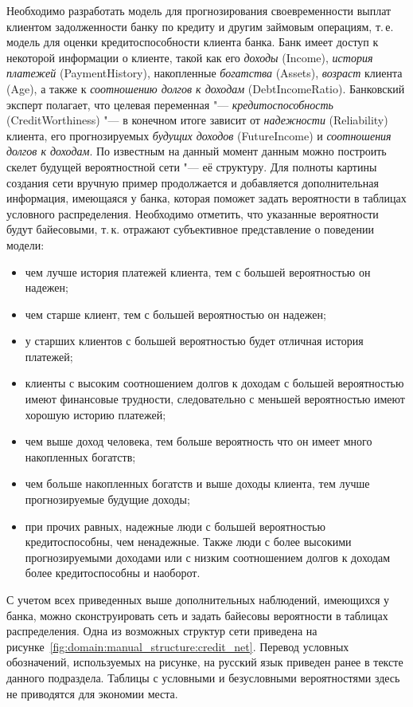 Необходимо разработать модель для  прогнозирования своевременности выплат клиентом задолженности банку по кредиту и другим займовым операциям, т.\,е. модель для оценки кредитоспособности клиента банка.
Банк имеет доступ к некоторой информации о клиенте, такой как его \emph{доходы} (Income), \emph{история платежей} (PaymentHistory), накопленные \emph{богатства} (Assets), \emph{возраст} клиента (Age), а также к \emph{соотношению долгов к доходам} (DebtIncomeRatio).
Банковский эксперт полагает, что целевая переменная "--- \emph{кредитоспособность} (CreditWorthiness) "--- в конечном итоге зависит от \emph{надежности} (Reliability) клиента, его прогнозируемых \emph{будущих доходов} (FutureIncome) и \emph{соотношения долгов к доходам}.
По известным на данный момент данным можно построить скелет будущей вероятностной сети "--- её структуру.
Для полноты картины создания сети вручную пример продолжается и добавляется дополнительная информация, имеющаяся у банка, которая поможет задать вероятности в таблицах условного распределения.
Необходимо отметить, что указанные вероятности будут байесовыми, т.\,к. отражают субъективное представление о поведении модели:
\begin{itemize}
  \item чем лучше история платежей клиента, тем с большей вероятностью он надежен;
  \item чем старше клиент, тем с большей вероятностью он надежен;
  \item у старших клиентов с большей вероятностью будет отличная история платежей;
  \item клиенты с высоким соотношением долгов к доходам с большей вероятностью имеют финансовые трудности, следовательно с меньшей вероятностью имеют хорошую историю платежей;
  \item чем выше доход человека, тем больше вероятность что он имеет много накопленных богатств;
  \item чем больше накопленных богатств и выше доходы клиента, тем лучше прогнозируемые будущие доходы;
  \item при прочих равных, надежные люди с большей вероятностью кредитоспособны, чем ненадежные. Также люди с более высокими прогнозируемыми доходами или с низким соотношением долгов к доходам более кредитоспособны и наоборот. 
\end{itemize}

С учетом всех приведенных выше дополнительных наблюдений, имеющихся у банка, можно сконструировать сеть и задать байесовы вероятности в таблицах распределения.
Одна из возможных структур сети приведена на рисунке~\ref{fig:domain:manual_structure:credit_net}.
Перевод условных обозначений, используемых на рисунке, на русский язык приведен ранее в тексте данного подраздела.
Таблицы с условными и безусловными вероятностями здесь не приводятся для экономии места.


